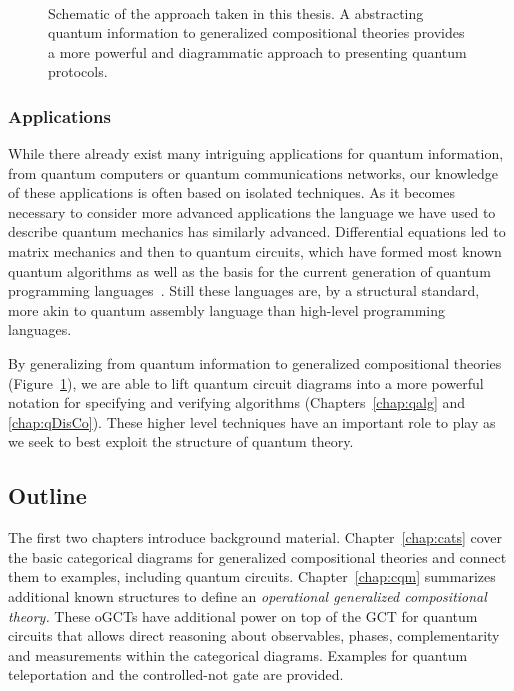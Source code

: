 \begin{figure}[t]
\label{fig:overview}
\begin{align*}

\end{align*}
\caption[Schematic of generalized compositional theories and categorical diagrams.]{Schematic of the approach taken in this thesis. A abstracting quantum information to generalized compositional theories provides a more powerful and diagrammatic approach to presenting quantum protocols.}
\end{figure}


\subsubsection*{Applications} While there already exist many intriguing applications for quantum information, from quantum computers or quantum communications networks, our knowledge of these applications is often based on isolated techniques. As it becomes necessary to consider more advanced applications the language we have used to describe quantum mechanics has similarly advanced. Differential equations led to matrix mechanics and then to quantum circuits, which have formed most known quantum algorithms as well as the basis for the current generation of quantum programming languages~\cite{green2013quipper,wecker2014liqui}. Still these languages are, by a structural standard, more akin to quantum assembly language than high-level programming languages. 

By generalizing from quantum information to generalized compositional theories (Figure~\ref{fig:overview}), we are able to lift quantum circuit diagrams into a more powerful notation for specifying and verifying algorithms (Chapters~\ref{chap:qalg} and \ref{chap:qDisCo}). These higher level techniques have an important role to play as we seek to best exploit the structure of quantum theory. 

\subsection*{Outline}

The first two chapters introduce background material. Chapter~\ref{chap:cats} cover the basic categorical diagrams for generalized compositional theories and connect them to examples, including quantum circuits. Chapter~\ref{chap:cqm} summarizes additional known structures to define an \emph{operational generalized compositional theory.} These oGCTs have additional power on top of the GCT for quantum circuits that allows direct reasoning about observables, phases, complementarity and measurements within the categorical diagrams. Examples for quantum teleportation and the controlled-not gate are provided.

